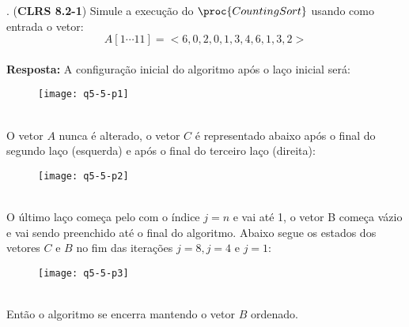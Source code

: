 
. (\textbf{CLRS 8.2-1}) Simule a execução do $\proc{CountingSort}$ 
usando como entrada o vetor:
\[ A[1 \cdots 11] = <6, 0, 2, 0, 1, 3, 4, 6, 1, 3, 2>  \]
\\ [6pt]
\textbf{Resposta:} A configuração inicial do algoritmo após o laço inicial será:
\begin{figure}[h]
  \centering
    \texttt{[image: q5-5-p1]}
\end{figure}
\\
O vetor $A$ nunca é alterado, o vetor $C$ é representado abaixo após o final do 
segundo laço (esquerda) e após o final do terceiro laço (direita):
\begin{figure}[h]
  \centering
    \texttt{[image: q5-5-p2]}
\end{figure}
\\
O último laço começa pelo com o índice $j = n$ e vai até 1, o vetor B começa 
vázio e vai sendo preenchido até o final do algoritmo. Abaixo segue os estados 
dos vetores $C$ e $B$ no fim das iterações $j = 8, j = 4$ e $j = 1$:
\begin{figure}[h]
  \centering
    \texttt{[image: q5-5-p3]}
\end{figure}
\\
Então o algoritmo se encerra mantendo o vetor $B$ ordenado.
\\[12pt]
